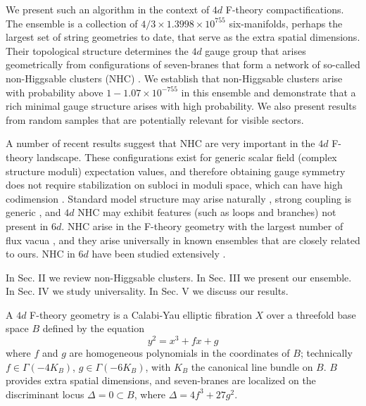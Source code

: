 \documentclass[aps,prl,twocolumn, superscriptaddress,groupedaddress,nofootinbib]{revtex4-1}
\begin{document}
We present such an algorithm in the context of $4d$ F-theory \cite{Vafa:1996xn,*Morrison:1996pp,*Morrison:1996pp}
compactifications. The ensemble is a collection of
$4/3\times 1.3998\times 10^{755}$ six-manifolds, perhaps the largest set
of string geometries to date, that serve as the extra spatial dimensions. Their topological structure determines the $4d$ gauge group that arises 
geometrically from
configurations of seven-branes that form a network of so-called non-Higgsable
clusters (NHC) \cite{Morrison:2012np}. We establish that non-Higgsable clusters arise with
probability above $1-1.07\times 10^{-755}$ in this ensemble and demonstrate that a rich minimal gauge structure arises with high probability. We also
present results from random samples that are potentially relevant for
visible sectors.

A number of recent results suggest that NHC are very
important in the $4d$ F-theory landscape. These configurations exist for generic
 scalar field (complex structure moduli) expectation values, and therefore obtaining
gauge symmetry does not require \cite{Grassi:2014zxa} stabilization on subloci in 
moduli space, which can have high codimension \cite{Braun:2014xka,*Watari:2015ysa,*Halverson:2016tve}. Standard model structure may arise naturally \cite{Grassi:2014zxa}, strong coupling is generic \cite{Halverson:2016vwx}, and $4d$ NHC may exhibit features \cite{Morrison:2014lca} (such as loops and branches) not present
in $6d$. NHC arise in the F-theory geometry with the largest number of flux
vacua \cite{Taylor:2015xtz}, and they arise universally in known ensembles 
\cite{Halverson:2015jua,*Taylor:2015ppa} that are closely related to ours.
NHC in $6d$ have been studied extensively \cite{Morrison:2012np,Morrison:2012js,*Taylor:2012dr,*Morrison:2014era,*Martini:2014iza,*Johnson:2014xpa,*Taylor:2015isa}.

In Sec. II we review non-Higgsable clusters. In Sec. III we present our ensemble.
In Sec. IV we study universality. In Sec. V we discuss our results.


\vspace{.2cm}
A $4d$ F-theory geometry is a Calabi-Yau elliptic fibration
$X$ over a threefold base space $B$ defined by the equation
\begin{equation}
y^2=x^3+f x + g
\end{equation}
where $f$ and $g$ are homogeneous polynomials in the coordinates
of $B$; technically $f\in \Gamma(-4K_B)$, $g\in \Gamma(-6K_B)$,
with $K_B$ the canonical line bundle on $B$. $B$ provides extra spatial dimensions, and seven-branes are localized on the discriminant locus
$\Delta=0\subset B$, where $\Delta = 4f^3+27g^2$.
\end{document}
